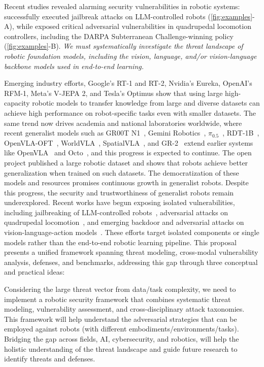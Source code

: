 {Recent studies revealed alarming security vulnerabilities in robotic systems: \cite{robey2024jailbreaking} successfully executed jailbreak attacks on LLM-controlled robots (\autoref{fig:examples}-A), while \cite{shi2024rethinking} exposed critical adversarial vulnerabilities in quadrupedal locomotion controllers, including the DARPA Subterranean Challenge-winning policy \cite{miki2022scirob,rslsubt2022} (\autoref{fig:examples}-B).
\emph{We must systematically investigate the threat landscape of robotic foundation models, including the vision, language, and/or vision-language backbone models used in end-to-end learning.}

Emerging industry efforts, \eg Google's RT-1 and RT-2, Nvidia's Eureka, OpenAI's RFM-1, Meta's V-JEPA 2, and Tesla's Optimus show that using large high-capacity robotic models to transfer knowledge from large and diverse datasets can achieve high performance on robot-specific tasks even with smaller datasets. 
The same trend now drives academia and national laboratories worldwide, where recent generalist models such as GR00T N1~\cite{gr00tn1}, Gemini Robotics~\cite{geminirobotics2025}, $\pi_{0.5}$~\cite{pi05_2025}, RDT-1B~\cite{rdt1b}, OpenVLA-OFT~\cite{openvla_oft}, WorldVLA~\cite{cen2025worldvla}, SpatialVLA~\cite{qu2025spatialvla}, and GR-2~\cite{cheang2024gr2} extend earlier systems like OpenVLA~\cite{kim2024openvla} and Octo~\cite{team2024octo}, and this progress is expected to continue. 
The open \xot \cite{9} project published a large \xot robotic dataset and shows that robots achieve better generalization when trained on such datasets.
The democratization of these models and resources promises continuous growth in generalist robots.
Despite this progress, the security and trustworthiness of generalist robots remain underexplored. Recent works have begun exposing isolated vulnerabilities, including jailbreaking of LLM-controlled robots~\cite{robey2024jailbreaking}, adversarial attacks on quadrupedal locomotion~\cite{shi2024rethinking}, and emerging backdoor and adversarial attacks on vision-language-action models~\cite{badvla,advvla}. These efforts target isolated components or single models rather than the end-to-end robotic learning pipeline.
This proposal presents a unified framework spanning threat modeling, cross-modal vulnerability analysis, defenses, and benchmarks, addressing this gap through three conceptual and practical ideas: 


Considering the large threat vector from data/task complexity,
we need to implement a robotic security framework that combines systematic threat modeling, vulnerability assessment, and cross-disciplinary attack taxonomies.
This framework will help understand the adversarial strategies that can be employed against robots (\ie with different embodiments/environments/tasks). 
Bridging the gap across fields, \ie AI, cybersecurity, and robotics, will help the holistic understanding of the threat landscape and guide future research to identify threats and defenses.

}
